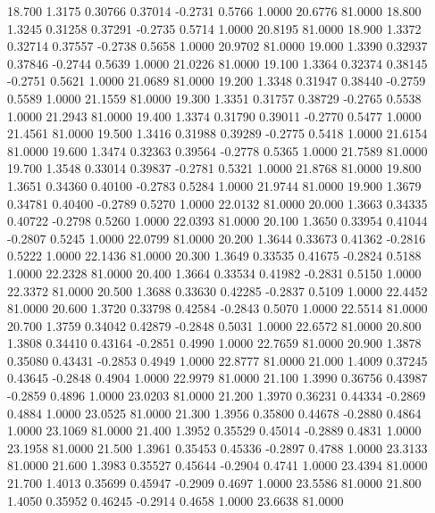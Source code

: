   18.700   1.3175   0.30766   0.37014  -0.2731   0.5766   1.0000  20.6776  81.0000
  18.800   1.3245   0.31258   0.37291  -0.2735   0.5714   1.0000  20.8195  81.0000
  18.900   1.3372   0.32714   0.37557  -0.2738   0.5658   1.0000  20.9702  81.0000
  19.000   1.3390   0.32937   0.37846  -0.2744   0.5639   1.0000  21.0226  81.0000
  19.100   1.3364   0.32374   0.38145  -0.2751   0.5621   1.0000  21.0689  81.0000
  19.200   1.3348   0.31947   0.38440  -0.2759   0.5589   1.0000  21.1559  81.0000
  19.300   1.3351   0.31757   0.38729  -0.2765   0.5538   1.0000  21.2943  81.0000
  19.400   1.3374   0.31790   0.39011  -0.2770   0.5477   1.0000  21.4561  81.0000
  19.500   1.3416   0.31988   0.39289  -0.2775   0.5418   1.0000  21.6154  81.0000
  19.600   1.3474   0.32363   0.39564  -0.2778   0.5365   1.0000  21.7589  81.0000
  19.700   1.3548   0.33014   0.39837  -0.2781   0.5321   1.0000  21.8768  81.0000
  19.800   1.3651   0.34360   0.40100  -0.2783   0.5284   1.0000  21.9744  81.0000
  19.900   1.3679   0.34781   0.40400  -0.2789   0.5270   1.0000  22.0132  81.0000
  20.000   1.3663   0.34335   0.40722  -0.2798   0.5260   1.0000  22.0393  81.0000
  20.100   1.3650   0.33954   0.41044  -0.2807   0.5245   1.0000  22.0799  81.0000
  20.200   1.3644   0.33673   0.41362  -0.2816   0.5222   1.0000  22.1436  81.0000
  20.300   1.3649   0.33535   0.41675  -0.2824   0.5188   1.0000  22.2328  81.0000
  20.400   1.3664   0.33534   0.41982  -0.2831   0.5150   1.0000  22.3372  81.0000
  20.500   1.3688   0.33630   0.42285  -0.2837   0.5109   1.0000  22.4452  81.0000
  20.600   1.3720   0.33798   0.42584  -0.2843   0.5070   1.0000  22.5514  81.0000
  20.700   1.3759   0.34042   0.42879  -0.2848   0.5031   1.0000  22.6572  81.0000
  20.800   1.3808   0.34410   0.43164  -0.2851   0.4990   1.0000  22.7659  81.0000
  20.900   1.3878   0.35080   0.43431  -0.2853   0.4949   1.0000  22.8777  81.0000
  21.000   1.4009   0.37245   0.43645  -0.2848   0.4904   1.0000  22.9979  81.0000
  21.100   1.3990   0.36756   0.43987  -0.2859   0.4896   1.0000  23.0203  81.0000
  21.200   1.3970   0.36231   0.44334  -0.2869   0.4884   1.0000  23.0525  81.0000
  21.300   1.3956   0.35800   0.44678  -0.2880   0.4864   1.0000  23.1069  81.0000
  21.400   1.3952   0.35529   0.45014  -0.2889   0.4831   1.0000  23.1958  81.0000
  21.500   1.3961   0.35453   0.45336  -0.2897   0.4788   1.0000  23.3133  81.0000
  21.600   1.3983   0.35527   0.45644  -0.2904   0.4741   1.0000  23.4394  81.0000
  21.700   1.4013   0.35699   0.45947  -0.2909   0.4697   1.0000  23.5586  81.0000
  21.800   1.4050   0.35952   0.46245  -0.2914   0.4658   1.0000  23.6638  81.0000
